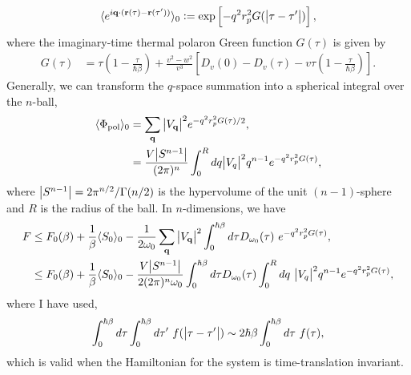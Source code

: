 \begin{equation}
    \langle e^{i \vb{q} \cdot (\vb{r}(\tau) - \vb{r}(\tau'))} \rangle_0 := \exp\left[-q^2 r_p^2 G(\abs{\tau - \tau'})\right] ,
\end{equation}
 where the imaginary-time thermal polaron Green function $G(\tau)$ is given by
\begin{equation} \label{eqn:polarongreensfunc}
    \begin{aligned}
        G(\tau) &= \tau \left(1 - \frac{\tau}{\hbar\beta}\right) + \frac{v^2 - w^2}{v^3} \left[ D_v(0) - D_v(\tau) - v \tau \left(1 - \frac{\tau}{\hbar\beta} \right) \right].
    \end{aligned}
\end{equation}
Generally, we can transform the $q$-space summation into a spherical integral over the $n$-ball,
\begin{equation} \label{eqn:general_self_interaction}
    \begin{aligned}
        \langle \Phi_{\text{pol}}\rangle_0 &= \sum_{\vb{q}} \abs{V_{\vb{q}}}^2 e^{-q^2 r_p^2 G(\tau) / 2} , \\
        &= \frac{V \abs{S^{n-1}}}{(2\pi)^n} \int_0^R dq \abs{V_q}^2 q^{n-1} e^{-q^2 r_p^2 G(\tau)} ,
    \end{aligned}
\end{equation}
where $\abs{S^{n-1}} = 2\pi^{n/2}/\Gamma(n/2)$ is the hypervolume of the unit $(n-1)$-sphere and $R$ is the radius of the ball. In $n$-dimensions, we have
\begin{equation}\label{eqn:generalfreeenergy}
    \begin{aligned}
        F &\leq F_0(\beta) + \frac{1}{\beta} \langle S_0 \rangle_{0} - \frac{1}{2\omega_0} \sum_{\vb{q}} \abs{V_{\vb{q}}}^2 \int_0^{\hbar\beta} d\tau D_{\omega_0}(\tau)\ e^{-q^2 r_p^2 G(\tau)} , \\
        &\leq F_0(\beta) + \frac{1}{\beta} \langle S_0 \rangle_{0} - \frac{V \abs{S^{n-1}}}{2 (2\pi)^n \omega_0} \int_0^{\hbar\beta} d\tau D_{\omega_0}(\tau) \int_0^R dq\ \abs{V_q}^2 q^{n-1} e^{-q^2 r_p^2 G(\tau)} ,
    \end{aligned}
\end{equation}
where I have used,
\begin{equation}
    \int_0^{\hbar\beta} d\tau \int_0^{\hbar\beta} d\tau'\ f(\abs{\tau - \tau'}) \sim 2\hbar\beta \int_0^{\hbar\beta}d\tau\ f(\tau),
\end{equation}
which is valid when the Hamiltonian for the system is time-translation invariant.

